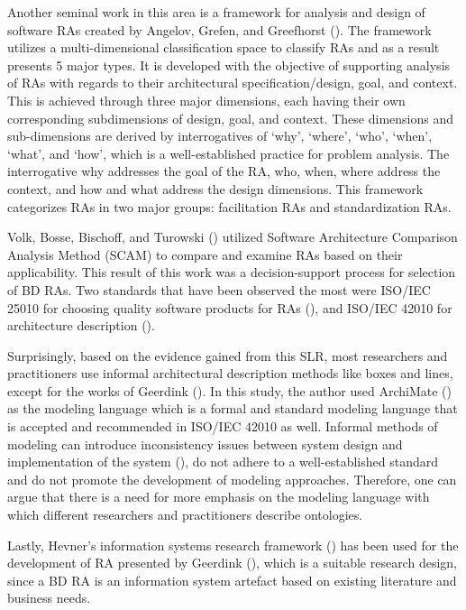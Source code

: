 \documentclass[review]{elsarticle}
\begin{document}
Another seminal work in this area is a framework for analysis and design of software RAs created by Angelov, Grefen, and Greefhorst (\cite{angelov2012framework}). The framework utilizes a multi-dimensional classification space to classify RAs and as a result presents 5 major types. It is developed with the objective of supporting analysis of RAs with regards to their architectural specification/design, goal, and context. This is achieved through three major dimensions, each having their own corresponding subdimensions of design, goal, and context. These dimensions and sub-dimensions are derived by interrogatives of ‘why’, ‘where’, ‘who’, ‘when’, ‘what’, and ‘how’, which is a well-established practice for problem analysis. The interrogative why addresses the goal of the RA, who, when, where address the context, and how and what address the design dimensions. This framework categorizes RAs in two major groups: facilitation RAs and standardization RAs.

Volk, Bosse, Bischoff, and Turowski (\cite{volk2019decision}) utilized Software Architecture Comparison Analysis Method (SCAM) to compare and examine RAs based on their applicability. This result of this work was a decision-support process for selection of BD RAs. Two standards that have been observed the most were ISO/IEC 25010 for choosing quality software products for RAs (\cite{Iso}), and ISO/IEC 42010 for architecture description (\cite{ISO42010}). 

Surprisingly, based on the evidence gained from this SLR, most researchers and practitioners use informal architectural description methods like boxes and lines, except for the works of Geerdink (\cite{geerdink2013reference}). In this study, the author used ArchiMate (\cite{josey2016introduction}) as the modeling language which is a formal and standard modeling language that is accepted and recommended in ISO/IEC 42010 as well. Informal methods of modeling can introduce inconsistency issues between system design and implementation of the system (\cite{zhu2005software}), do not adhere to a well-established standard and do not promote the development of modeling approaches. Therefore, one can argue that there is a need for more emphasis on the modeling language with which different researchers and practitioners describe ontologies.

Lastly, Hevner's information systems research framework (\cite{hevner2004design}) has been used for the development of RA presented by Geerdink (\cite{geerdink2013reference}), which is a suitable research design, since a BD RA is an information system artefact based on existing literature and business needs. 
\end{document}

